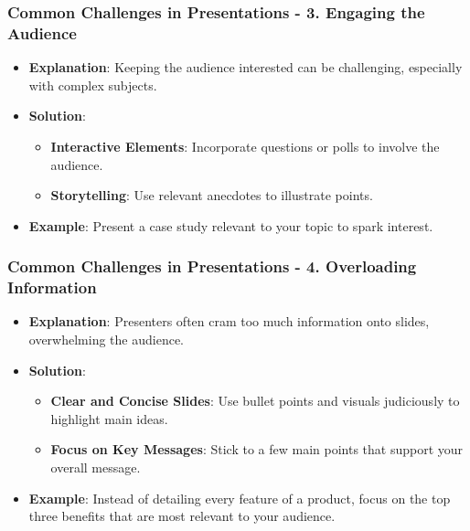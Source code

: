 \documentclass[aspectratio=169]{beamer}
\begin{document}
\begin{frame}[fragile]
    \frametitle{Common Challenges in Presentations - 3. Engaging the Audience}
    \begin{itemize}
        \item \textbf{Explanation}: Keeping the audience interested can be challenging, especially with complex subjects.
        \item \textbf{Solution}: 
        \begin{itemize}
            \item \textbf{Interactive Elements}: Incorporate questions or polls to involve the audience.
            \item \textbf{Storytelling}: Use relevant anecdotes to illustrate points.
        \end{itemize}
        \item \textbf{Example}: Present a case study relevant to your topic to spark interest.
    \end{itemize}
\end{frame}

\begin{frame}[fragile]
    \frametitle{Common Challenges in Presentations - 4. Overloading Information}
    \begin{itemize}
        \item \textbf{Explanation}: Presenters often cram too much information onto slides, overwhelming the audience.
        \item \textbf{Solution}: 
        \begin{itemize}
            \item \textbf{Clear and Concise Slides}: Use bullet points and visuals judiciously to highlight main ideas.
            \item \textbf{Focus on Key Messages}: Stick to a few main points that support your overall message.
        \end{itemize}
        \item \textbf{Example}: Instead of detailing every feature of a product, focus on the top three benefits that are most relevant to your audience.
    \end{itemize}
\end{frame}
\end{document}
